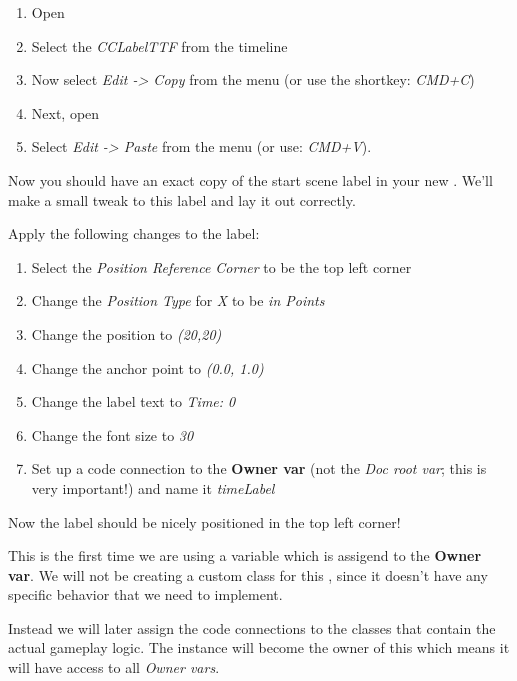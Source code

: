 \begin{leftbar}
\begin{enumerate}
  \item Open 
  \item Select the \textit{CCLabelTTF} from the
timeline
\item Now select \textit{Edit -> Copy} from the \SB{} menu (or use the
shortkey: \textit{CMD+C})
\item Next, open 
\item Select \textit{Edit -> Paste} from
the \SB{} menu (or use: \textit{CMD+V}).
\end{enumerate} 
\end{leftbar}

Now you should have an exact copy of the start scene label in your new
\ccbfile{}. We'll make a small tweak to this label and lay it out
correctly.

\begin{leftbar}
Apply the following changes to the label:
\begin{enumerate}
  \item Select the \textit{Position Reference Corner} to be the top left corner
  \item Change the \textit{Position Type} for \textit{X} to be \textit{in
  Points}
  \item Change the position to \textit{(20,20)}
  \item Change the anchor point to \textit{(0.0, 1.0)}
  \item Change the label text to \textit{Time: 0}
  \item Change the font size to \textit{30}
  \item Set up a code connection to the \textbf{Owner var} (not the \textit{Doc
  root var}; this is very important!) and name it \textit{timeLabel}
\end{enumerate}
\end{leftbar}

Now the label should be nicely positioned in the top left corner! 

This is the first time we are using a variable which is assigend to the
\textbf{Owner var}. We will not be creating a custom class for this \ccbfile{},
since it doesn't have any specific behavior that we need to implement. 

Instead we will later assign the code connections to the classes that
contain the actual gameplay logic. The  instance will
become the owner of this \ccbfile{} which means it will have access to all
\textit{Owner vars}.


